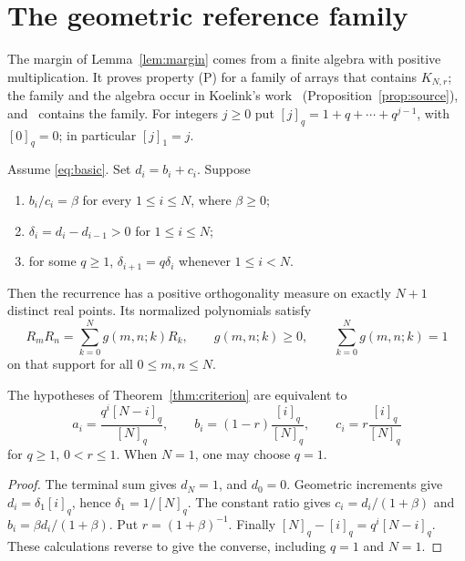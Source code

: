 \section{The geometric reference family}\label{sec:reference}
The margin of Lemma~\ref{lem:margin} comes from a finite algebra with positive multiplication. It proves property (P) for a family of arrays that contains $K_{N,r}$; the family and the algebra occur in Koelink's work~\cite{koelink} (Proposition~\ref{prop:source}), and~\cite[Theorem~]{P1} contains the family. For integers $j\geq0$ put $[j]_q=1+q+\cdots+q^{j-1}$, with $[0]_q=0$; in particular $[j]_1=j$.

\begin{samepage}
\begin{theorem}\label{thm:criterion}
Assume \eqref{eq:basic}. Set $d_i=b_i+c_i$. Suppose
\begin{enumerate}
\item $b_i/c_i=\beta$ for every $1\leq i\leq N$, where $\beta\geq0$;
\item $\delta_i=d_i-d_{i-1}>0$ for $1\leq i\leq N$;
\item for some $q\geq1$, $\delta_{i+1}=q\delta_i$ whenever $1\leq i<N$.
\end{enumerate}
Then the recurrence has a positive orthogonality measure on exactly $N+1$ distinct real points. Its normalized polynomials satisfy
\begin{equation}\label{eq:positive}
R_mR_n=\sum_{k=0}^N g(m,n;k)R_k,
\qquad g(m,n;k)\geq0,\qquad\sum_{k=0}^N g(m,n;k)=1
\end{equation}
on that support for all $0\leq m,n\leq N$.
\end{theorem}
\end{samepage}

\begin{lemma}\label{lem:parameters}
The hypotheses of Theorem~\ref{thm:criterion} are equivalent to
\begin{equation}\label{eq:parameters}
a_i=\frac{q^i[N-i]_q}{[N]_q},\qquad
b_i=(1-r)\frac{[i]_q}{[N]_q},\qquad
c_i=r\frac{[i]_q}{[N]_q}
\end{equation}
for $q\geq1$, $0<r\leq1$. When $N=1$, one may choose $q=1$.
\end{lemma}
\begin{proof}
The terminal sum gives $d_N=1$, and $d_0=0$. Geometric increments give $d_i=\delta_1[i]_q$, hence $\delta_1=1/[N]_q$. The constant ratio gives $c_i=d_i/(1+\beta)$ and $b_i=\beta d_i/(1+\beta)$. Put $r=(1+\beta)^{-1}$. Finally $[N]_q-[i]_q=q^i[N-i]_q$. These calculations reverse to give the converse, including $q=1$ and $N=1$.
\end{proof}


